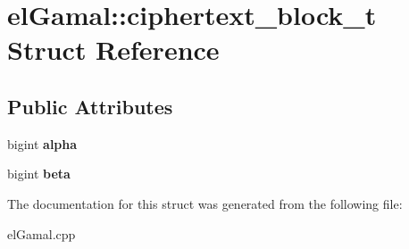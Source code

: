 \hypertarget{structelGamal_1_1ciphertext__block__t}{}\section{el\+Gamal\+:\+:ciphertext\+\_\+block\+\_\+t Struct Reference}
\label{structelGamal_1_1ciphertext__block__t}
\subsection*{Public Attributes}
\begin{DoxyCompactItemize}
\item 
\mbox{\label{structelGamal_1_1ciphertext__block__t_a41374f56dc6f4eaf47a68e1ec0fd6028}} 
bigint {\bfseries alpha}
\item 
\mbox{\label{structelGamal_1_1ciphertext__block__t_ab49b638b6d57044532b92dc6dece00af}} 
bigint {\bfseries beta}
\end{DoxyCompactItemize}


The documentation for this struct was generated from the following file\+:\begin{DoxyCompactItemize}
\item 
el\+Gamal.\+cpp\end{DoxyCompactItemize}
